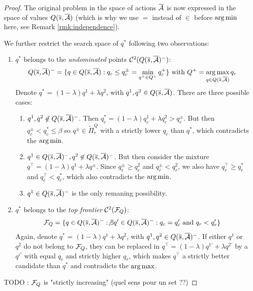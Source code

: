\begin{proof}
The original problem in the space of actions $\overline{\mathcal{A}}$ is now expressed in the space of values $Q(\overline{s}, \overline{\mathcal{A}})$ (which is why we use $=$ instead of $\in$ before $\operatorname*{arg\,min}$ here, see Remark \ref{rmk:independence}).

We further restrict the search space of $q^*$ following two observations:
\begin{enumerate}
    \item $q^*$ belongs to the \emph{undominated} points $\mathcal{C}^2(Q(\overline{s},\overline{\mathcal{A}})^-)$:
    \begin{equation*}
        Q(\overline{s},\overline{\mathcal{A}})^- = \{q\in Q(\overline{s},\overline{\mathcal{A}}): q_c \leq q_c^{\pm} = \min_{q^+\in Q^+} q_c^+\}\text{ with }Q^+ = \operatorname*{arg\,max}_{q\in Q(\overline{s},\overline{\mathcal{A}})} q_r
    \end{equation*}
    Denote $q^*$ = $(1-\lambda) q^1 + \lambda q^2$, with $q^1, q^2\in Q(\overline{s},\overline{\mathcal{A}})$. There are three possible cases:
    \begin{enumerate}
        \item $q^1, q^2 \not\in Q(\overline{s},\overline{\mathcal{A}})^-$. Then $q_c^* = (1-\lambda) q^1_c + \lambda q^2_c > q_c^{\pm}$. But then $q_c^{\pm} < q_c^* \leq \beta$ so $q^{\pm}\in\tilde{\Pi}^Q_r$ with a strictly lower $q_c$ than $q^*$, which contradicts the $\operatorname*{arg\,min}$.
        \item $q^1\in Q(\overline{s},\overline{\mathcal{A}})^-, q^2 \not\in Q(\overline{s},\overline{\mathcal{A}})^-$. But then consider the mixture $q^\top = (1-\lambda) q^1 + \lambda q^\pm$. Since $q_r^{\pm} \geq q_r^{2}$ and $q_r^{\pm} < q_r^{2}$, we also have $q^\top_r \geq q_r^*$ and $q^\top_c < q_c^*$, which also contradicts the $\operatorname*{arg\,min}$.
        \item $q^1\in Q(\overline{s},\overline{\mathcal{A}})^-$ is the only remaning possibility.
    \end{enumerate}
    \item $q^*$ belongs to the \emph{top frontier} $\mathcal{C}^2(\mathcal{F}_Q)$:
    \begin{equation*}
        \mathcal{F}_Q = \{q\in Q(\overline{s}, \overline{\mathcal{A}})^-: \not\exists q'\in Q(\overline{s}, \overline{\mathcal{A}})^-: q_c=q_c'\text{ and }q_r<q_r'\}
    \end{equation*}
    Again, denote $q^*$ = $(1-\lambda) q^1 + \lambda q^2$, with $q^1, q^2\in Q(\overline{s},\overline{\mathcal{A}})^-$.
    If either $q^1$ or $q^2$ do not belong to $\mathcal{F}_Q$, they can be replaced in $q^\top = (1-\lambda) q^{1'} + \lambda q^{2'}$ by a $q^{i'}$ with equal $q_c$ and strictly higher $q_r$, which makes $q^\top$ a strictly better candidate than $q^*$ and contradicts the $\operatorname*{arg\,max}$.
\end{enumerate}




TODO : $\mathcal{F}_Q$ is "strictly increasing" (quel sens pour un set ??)


\end{proof}
